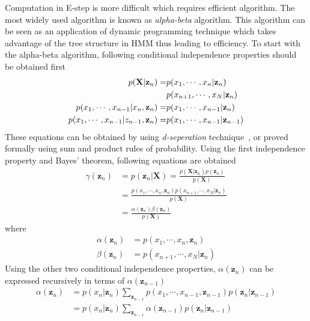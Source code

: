 Computation in E-step is more difficult which requires efficient algorithm. The most widely used algorithm is known as \textit{alpha-beta} algorithm. This algorithm can be seen as an application of dynamic programming technique which takes advantage of the tree structure in HMM thus leading to efficiency. To start with the alpha-beta algorithm, following conditional independence properties should be obtained first~\cite{jordan2003introduction}
\begin{align}
	p(\mathbf{X}| \mathbf{z}_n) = &p(x_1, \cdots, x_n | \mathbf{z}_n)	\notag \\	
										&p(x_{n+1}, \cdots, x_N | \mathbf{z}_n) \\
	p(x_1, \cdots, x_{n-1}| x_n, \mathbf{z}_n) = &p(x_1, \cdots, x_{n-1} | \mathbf{z}_n)	\\
	p(x_1, \cdots, x_{n-1}| z_{n-1}, \mathbf{z}_n) = &p(x_1, \cdots, x_{n-1} | \mathbf{z}_{n-1})
\end{align}
These equations can be obtained by using \textit{d-seperation} technique~\cite{pearl2014probabilistic}, or proved formally using sum and product rules of probability. Using the first independence property and Bayes' theorem, following equations are obtained
\begin{equation}
	\label{eq:gammaZn}
	\begin{split}
	\gamma(\mathbf{z}_n) &= p(\mathbf{z}_n | \mathbf{X})  = \frac{p(\mathbf{X}| \mathbf{z}_n)p(\mathbf{z}_n)}{p(\mathbf{X})}	\\
										 & = \frac{p(x_1, \cdots, x_n, \mathbf{z}_n)p(x_{n+1}, \cdots, x_N | \mathbf{z}_n)}{p(\mathbf{X})}	\\
										 & = \frac{\alpha(\mathbf{z}_n)\beta(\mathbf{z}_n)}{p(\mathbf{X})}
	\end{split}
\end{equation}
where
\begin{align}
	\alpha(\mathbf{z}_n) & = p(x_1, \cdots, x_n, \mathbf{z}_n)\\
	\beta(\mathbf{z}_n)  & = p(x_{n+1}, \cdots, x_N | \mathbf{z}_n)
\end{align}
Using the other two conditional independence properties, \(\alpha(\mathbf{z}_n)\) can be expressed recursively in terms of \(\alpha(\mathbf{z}_{n-1})\)
\begin{equation}
	\begin{split}
	\alpha(\mathbf{z}_n) &=  p(x_n | \mathbf{z}_n) \sum_{\mathbf{z}_{n-1}}p(x_1, \cdots, x_{n-1}, \mathbf{z}_{n-1})p(\mathbf{z}_n | \mathbf{z}_{n-1}) \\
						 &=  p(x_n | \mathbf{z}_n) \sum_{\mathbf{z}_{n-1}} \alpha(\mathbf{z}_{n-1})p(\mathbf{z}_n | \mathbf{z}_{n-1})
	\end{split}
\end{equation}
